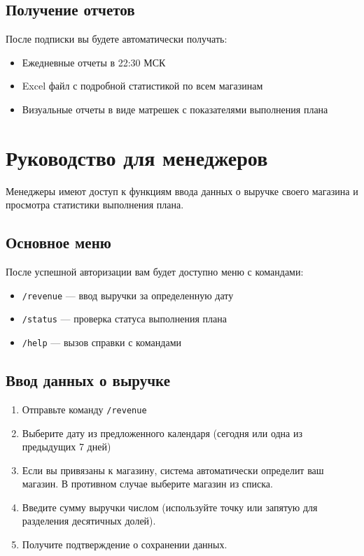 \documentclass[a4paper,12pt]{article}
\begin{document}
\subsection{Получение отчетов}
После подписки вы будете автоматически получать:
\begin{itemize}
    \item Ежедневные отчеты в 22:30 МСК
    \item Excel файл с подробной статистикой по всем магазинам
    \item Визуальные отчеты в виде матрешек с показателями выполнения плана
\end{itemize}

\section{Руководство для менеджеров}

Менеджеры имеют доступ к функциям ввода данных о выручке своего магазина и просмотра статистики выполнения плана.

\subsection{Основное меню}
После успешной авторизации вам будет доступно меню с командами:
\begin{itemize}
    \item \texttt{/revenue} — ввод выручки за определенную дату
    \item \texttt{/status} — проверка статуса выполнения плана
    \item \texttt{/help} — вызов справки с командами
\end{itemize}

\subsection{Ввод данных о выручке}
\begin{enumerate}
    \item Отправьте команду \texttt{/revenue}
    \item Выберите дату из предложенного календаря (сегодня или одна из предыдущих 7 дней)
    \item Если вы привязаны к магазину, система автоматически определит ваш магазин. В противном случае выберите магазин из списка.
    \item Введите сумму выручки числом (используйте точку или запятую для разделения десятичных долей).
    \item Получите подтверждение о сохранении данных.
\end{enumerate}
\end{document}
